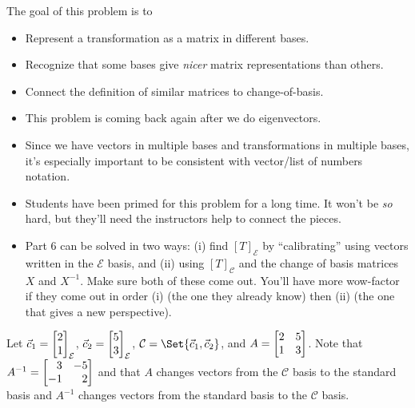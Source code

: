 \documentclass{problemset}
\newcommand{\bookonlynewpage}{\begin{bookonly}\newpage\end{bookonly}}
\begin{document}
	\bookonlynewpage
	\question
	\begin{annotation}
		\begin{goals}

			The goal of this problem is to
			\begin{itemize}
				\item Represent a transformation as a matrix in different bases.
				\item Recognize that some bases give \emph{nicer} matrix representations
					than others.
				\item Connect the definition of similar matrices to change-of-basis.
			\end{itemize}
		\end{goals}

		\begin{notes}
			\begin{itemize}
				\item This problem is coming back again after we do eigenvectors.
				\item Since we have vectors in multiple bases and transformations in
					multiple bases, it's especially important to be consistent
					with vector/list of numbers notation.
				\item Students have been primed for this problem for a long time. It won't
					be \emph{so} hard, but they'll need the instructors help to connect the
					pieces.
				\item Part 6 can be solved in two ways: (i) find $[T]_{\mathcal E}$ by ``calibrating''
					using vectors written in the $\mathcal E$ basis, and (ii) using $[T]_{\mathcal C}$
					and the change of basis matrices $X$ and $X^{-1}$. Make sure both of these come out.
					You'll have more wow-factor if they come out in order (i) (the one
					they already know) then (ii) (the one that gives a new perspective).
			\end{itemize}
		\end{notes}
	\end{annotation}
	Let $\vec c_1=\mat{2\\1}_{\mathcal E}$, $\vec c_2=\mat{5\\3}_{\mathcal E}$, $\mathcal C=\Set{\vec c_1,\vec c_2}$, and $A=\mat{2&5\\1&3}$.
	Note that $A^{-1}=\mat{3&-5\\-1&2}$ and that $A$ changes vectors from the $\mathcal C$ basis to the standard
	basis and $A^{-1}$ changes vectors from the standard basis to the $\mathcal C$ basis.
\end{document}
